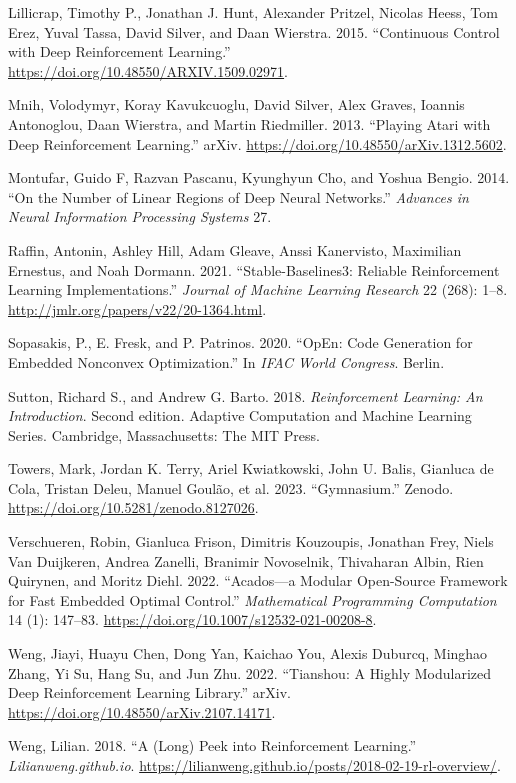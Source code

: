\documentclass[
  letterpaper,
  DIV=11,
  numbers=noendperiod,
  oneside]{scrartcl}
\newlength{\cslhangindent}
\newenvironment{CSLReferences}[2] %
 {\begin{list}{}{%
  \setlength{\itemindent}{0pt}
  \setlength{\leftmargin}{0pt}
  \setlength{\parsep}{0pt}
  \ifodd #1
   \setlength{\leftmargin}{\cslhangindent}
   \setlength{\itemindent}{-1\cslhangindent}
  \fi
  \setlength{\itemsep}{#2\baselineskip}}}
 {\end{list}}
\begin{document}
\begin{CSLReferences}{1}{0}
Lillicrap, Timothy P., Jonathan J. Hunt, Alexander Pritzel, Nicolas
Heess, Tom Erez, Yuval Tassa, David Silver, and Daan Wierstra. 2015.
{``Continuous Control with Deep Reinforcement Learning.''}
\url{https://doi.org/10.48550/ARXIV.1509.02971}.

Mnih, Volodymyr, Koray Kavukcuoglu, David Silver, Alex Graves, Ioannis
Antonoglou, Daan Wierstra, and Martin Riedmiller. 2013. {``Playing
{Atari} with {Deep Reinforcement Learning}.''} arXiv.
\url{https://doi.org/10.48550/arXiv.1312.5602}.

Montufar, Guido F, Razvan Pascanu, Kyunghyun Cho, and Yoshua Bengio.
2014. {``On the Number of Linear Regions of Deep Neural Networks.''}
\emph{Advances in Neural Information Processing Systems} 27.

Raffin, Antonin, Ashley Hill, Adam Gleave, Anssi Kanervisto, Maximilian
Ernestus, and Noah Dormann. 2021. {``Stable-{Baselines3}: {Reliable
Reinforcement Learning Implementations}.''} \emph{Journal of Machine
Learning Research} 22 (268): 1--8.
\url{http://jmlr.org/papers/v22/20-1364.html}.

Sopasakis, P., E. Fresk, and P. Patrinos. 2020. {``{OpEn}: {Code}
Generation for Embedded Nonconvex Optimization.''} In \emph{{IFAC} World
Congress}. Berlin.

Sutton, Richard S., and Andrew G. Barto. 2018. \emph{Reinforcement
Learning: An Introduction}. Second edition. Adaptive Computation and
Machine Learning Series. Cambridge, Massachusetts: The MIT Press.

Towers, Mark, Jordan K. Terry, Ariel Kwiatkowski, John U. Balis,
Gianluca de Cola, Tristan Deleu, Manuel Goulão, et al. 2023.
{``Gymnasium.''} Zenodo. \url{https://doi.org/10.5281/zenodo.8127026}.

Verschueren, Robin, Gianluca Frison, Dimitris Kouzoupis, Jonathan Frey,
Niels Van Duijkeren, Andrea Zanelli, Branimir Novoselnik, Thivaharan
Albin, Rien Quirynen, and Moritz Diehl. 2022. {``Acados---a Modular
Open-Source Framework for Fast Embedded Optimal Control.''}
\emph{Mathematical Programming Computation} 14 (1): 147--83.
\url{https://doi.org/10.1007/s12532-021-00208-8}.

Weng, Jiayi, Huayu Chen, Dong Yan, Kaichao You, Alexis Duburcq, Minghao
Zhang, Yi Su, Hang Su, and Jun Zhu. 2022. {``Tianshou: A {Highly
Modularized Deep Reinforcement Learning Library}.''} arXiv.
\url{https://doi.org/10.48550/arXiv.2107.14171}.

Weng, Lilian. 2018. {``A (Long) Peek into Reinforcement Learning.''}
\emph{Lilianweng.github.io}.
\url{https://lilianweng.github.io/posts/2018-02-19-rl-overview/}.

\end{CSLReferences}
\end{document}
